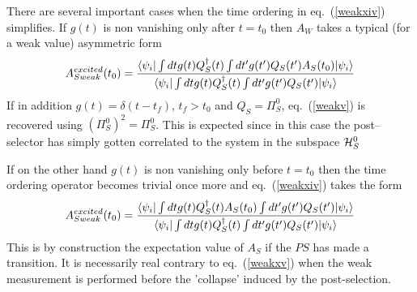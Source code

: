\documentclass[12pt,oneside]{report}
\def\bra#1{\langle #1|}
\def\p {\prime}
\newcommand{\bi}{\mbox{$ \bra{\psi_i} $}}
\begin{document}
There are
several important cases when the time ordering in eq.~(\ref{weakxiv}) 
simplifies.
If $g(t)$ is non vanishing only after $t=t_0$ then $A_W$ takes a
typical (for a weak value) asymmetric form 
\begin{equation} A_{S weak}^{excited}(t_0) =  {
\bi \int dt g(t) Q_S^\dagger (t)
 \int dt^\p g(t^\p) Q_S(t^\p)  A_S(t_0) \ki \over \bi \int dt g(t) Q_S^\dagger
(t) \int dt^\p g(t^\p) Q_S(t^\p) \ki} \label{weakxv} \end{equation}
If in addition $g(t)=\delta(t-t_f)$, $t_f >t_0$ and $Q_S=\Pi_S^0$,
eq.~(\ref{weakv}) is recovered using $ (\Pi_S^0)^2 = \Pi_S^0$. This
is expected since in this case the post--selector has simply gotten
correlated to the system in the subspace ${\cal H}^0_S$

If on the other hand $g(t)$ is non vanishing only before $t=t_0$ then
the time
ordering operator becomes trivial once more and eq.~(\ref{weakxiv}) takes the
form \begin{equation} A_{S weak}^{excited}(t_0) =  { \bi \int dt g(t)
Q_S^\dagger (t) A_S(t_0)
 \int dt^\p g(t^\p) Q_S(t^\p)   \ki \over \bi \int dt g(t) Q_S^\dagger (t)
\int dt^\p g(t^\p) Q_S(t^\p) \ki} \label{weakxvi}
\end{equation}
This is by construction the
 expectation value of $A_S$ if the $PS$ has made a transition. 
It is
necessarily real contrary to  eq.~(\ref{weakxv}) when
the weak measurement is performed before the 'collapse' induced by 
the post-selection.
\end{document}
